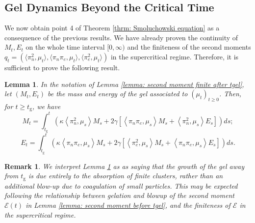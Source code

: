 \documentclass[11pt, notitlepage]{article}
\newtheorem{lem}[thm]{Lemma}
\newtheorem{rmk}[thm]{Remark}
\begin{document}
\subsection{\textbf{Gel Dynamics Beyond the Critical Time}} We now obtain point 4 of Theorem \ref{thrm: Smoluchowski equation}  as a consequence of the previous results. We have already proven the continuity of $M_t, E_t$ on the whole time interval $[0,\infty)$ and the finiteness of the second moments $q_t=(\langle  \pi_n^2, \mu_t\rangle, \langle  \pi_n\pi_e, \mu_t\rangle, \langle  \pi_e^2, \mu_t\rangle)$ in the supercritical regime. Therefore, it is sufficient to prove the following result.
\begin{lem}\label{lemma: dynamics after tgel} In the notation of Lemma \ref{lemma: second moment finite after tgel}, let $(M_t, E_t)$ be the mass and energy of the gel associated to $(\mu_t)_{t\ge 0}$. Then, for  $t\ge t_\mathrm{g}$, we have
\begin{equation}
    M_t=\int_{t_\mathrm{g}}^t 
    \left(
      \kappa \left<\pi_n^2,\mu_s\right>M_s +
      2\gamma \left[
        \left<\pi_n \pi_e,\mu_s \right>M_s +
        \left<\pi_n^2,\mu_s \right>E_s \right]
    \right)ds;
\end{equation}
\begin{equation}
    E_t=\int_{t_\mathrm{g}}^t 
    \left(
      \kappa \left<\pi_n \pi_e,\mu_s\right>M_s +
      2\gamma \left[
        \left<\pi_e^2,\mu_s \right>M_s +
        \left<\pi_n \pi_e,\mu_s \right>E_s \right]
    \right)ds.
\end{equation}\end{lem} \begin{rmk}\label{rmk: continuity of tgelt} We interpret Lemma \ref{lemma: dynamics after tgel} as as saying that the growth of the gel away from $t_\mathrm{g}$ is due entirely to the absorption of finite clusters, rather than an additional blow-up due to coagulation of small particles. This may be expected following the relationship between gelation and blowup of the second moment $\mathcal{E}(t)$ in Lemma \ref{lemma: second moment before tgel}, and the finiteness of $\mathcal{E}$ in the supercritical regime. \end{rmk}
\end{document}

